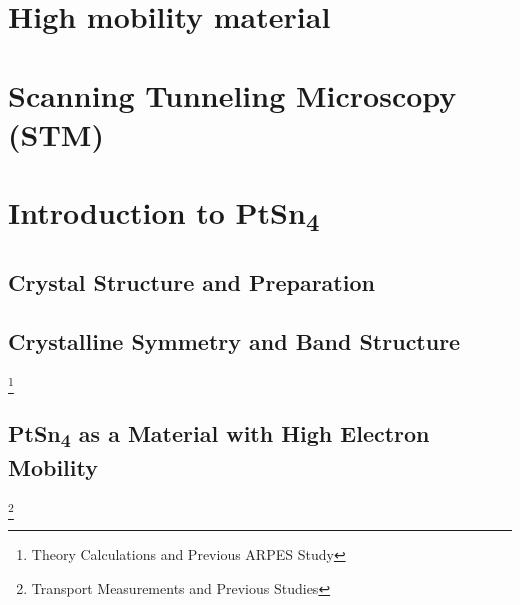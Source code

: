 \chapter{High mobility material}

\chapter{Scanning Tunneling Microscopy (STM)}
	

\chapter{Introduction to PtSn\textsubscript{4}}
	\section{Crystal Structure and Preparation}
	\section{Crystalline Symmetry and Band Structure} 
\footnote{Theory Calculations and Previous ARPES Study}
	\section{PtSn\textsubscript{4} as a Material with High Electron Mobility}
	\footnote{Transport Measurements and Previous Studies}










